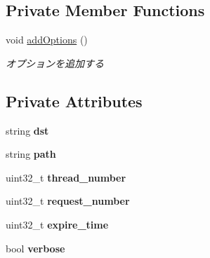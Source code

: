 \subsection*{Private Member Functions}
\begin{DoxyCompactItemize}
\item 
\mbox{\label{class_http_load_tester_options_aa8f1a91b911d9d5e1d39475e6ac1fa3e}} 
void \mbox{\hyperlink{class_http_load_tester_options_aa8f1a91b911d9d5e1d39475e6ac1fa3e}{add\+Options}} ()
\begin{DoxyCompactList}\small\item\em オプションを追加する \end{DoxyCompactList}\end{DoxyCompactItemize}
\subsection*{Private Attributes}
\begin{DoxyCompactItemize}
\item 
\mbox{\label{class_http_load_tester_options_a7537010767c2b21de982333f0b633b5d}} 
string {\bfseries dst}
\item 
\mbox{\label{class_http_load_tester_options_a862eb478246f91578132f5d8eeaa7de9}} 
string {\bfseries path}
\item 
\mbox{\label{class_http_load_tester_options_a2d4cc41774e040a77f62d84e95cb1131}} 
uint32\+\_\+t {\bfseries thread\+\_\+number}
\item 
\mbox{\label{class_http_load_tester_options_a6a453a3ee1096f8a8f9166bed46cf811}} 
uint32\+\_\+t {\bfseries request\+\_\+number}
\item 
\mbox{\label{class_http_load_tester_options_a84a7933df80d15873893b38b0d11636c}} 
uint32\+\_\+t {\bfseries expire\+\_\+time}
\item 
\mbox{\label{class_http_load_tester_options_a0759dc95082494148e28f57a43ca7a7c}} 
bool {\bfseries verbose}
\end{DoxyCompactItemize}
